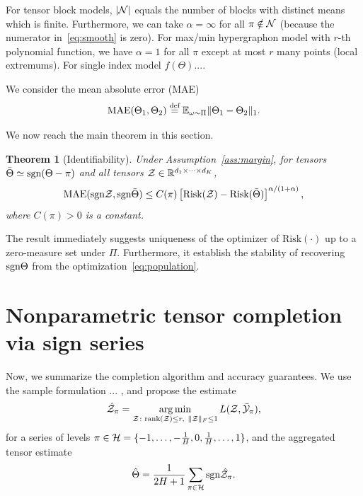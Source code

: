 \documentclass{article}
\theoremstyle{plain}
\newtheorem{thm}{Theorem}[section]
\theoremstyle{definition}
\def\sign{\textup{sgn}}
\def\caliP{\mathscr{P}_{\textup{sgn}}}
\begin{document}
For tensor block models, $|\mathcal{N}|$ equals the number of blocks with distinct means which is finite. Furthermore, we can take $\alpha= \infty$ for all $\pi \notin \mathcal{N}$ (because the numerator in~\eqref{eq:smooth} is zero). For max/min hypergraphon model with $r$-th polynomial function, we have $\alpha=1$ for all $\pi$ except at most $r$ many points (local extremums). For single index model $f(\Theta)$....

We consider the mean absolute error (MAE)
\[
\text{MAE}(\Theta_1, \Theta_2)\stackrel{\text{def}}{=}\mathbb{E}_{\omega\sim \Pi}\lVert\Theta_1-\Theta_2\rVert_1.
\]

We now reach the main theorem in this section. 
\begin{thm}[Identifiability] Under Assumption~\ref{ass:margin}, for tensors $\bar \Theta \simeq \sign(\Theta-\pi)$ and all tensors $\mathcal{Z}\in\mathbb{R}^{d_1\times \cdots \times d_K}$,
\[
\textup{MAE}(\sign \tZ, \sign \bar \Theta) \leq C(\pi)\left[\textup{Risk}(\tZ)-\textup{Risk}( \bar \Theta)\right]^{\alpha/(1+\alpha)},
\]
where $C(\pi)>0$ is a constant. 
\end{thm}
The result immediately suggests uniqueness of the optimizer of $\text{Risk}(\cdot)$ up to a zero-measure set under $\Pi$. Furthermore, it establish the stability of recovering $\sign \Theta$ from the optimization~\eqref{eq:population}.  



\section{Nonparametric tensor completion via sign series}

Now, we summarize the completion algorithm and accuracy guarantees. We use the sample formulation ... , and propose the estimate
\begin{equation}\label{eq:estimate}
\hat \tZ_\pi = \argmin_{\tZ\colon \text{rank}(\tZ)\leq r, \ \FnormSize{}{\tZ}\leq 1} L(\tZ,\bar \tY_\pi),
\end{equation}
for a series of levels $\pi \in \mathcal{H}=\{-1,\ldots,-{1\over H}, 0, {1\over H},\ldots,1\}$, and the aggregated tensor estimate
\[
\hat \Theta = {1\over 2H+1}\sum_{\pi \in \tH}\sign{\hat \tZ_\pi}.
\]
\end{document}
